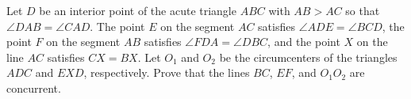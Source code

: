 Let $D$ be an interior point of the acute triangle $ABC$
with $AB > AC$ so that $\angle DAB = \angle CAD$.
The point $E$ on the segment $AC$ satisfies $\angle ADE =\angle BCD$,
the point $F$ on the segment $AB$ satisfies $\angle FDA =\angle DBC$,
and the point $X$ on the line $AC$ satisfies $CX = BX$.
Let $O_1$ and $O_2$ be the circumcenters of the triangles
$ADC$ and $EXD$, respectively.
Prove that the lines $BC$, $EF$, and $O_1O_2$ are concurrent.